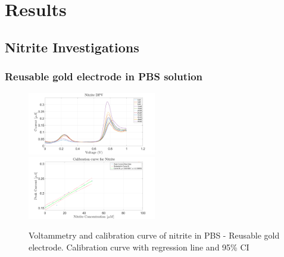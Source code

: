 \section{Results}

\subsection{Nitrite Investigations}

\subsubsection*{Reusable gold electrode in PBS solution}
\begin{figure}[H]
    \centering
    \includegraphics[width = 0.5\textwidth]{img/nitrite clean reus.png}
    \includegraphics[width = 0.5\textwidth]{img/nitrite clean reus calibration.PNG}
     \caption{Voltammetry and calibration curve of nitrite in PBS - Reusable gold electrode. Calibration curve with regression line and 95\% CI} 
    \label{fig:nitrite_result_1}
\end{figure}

